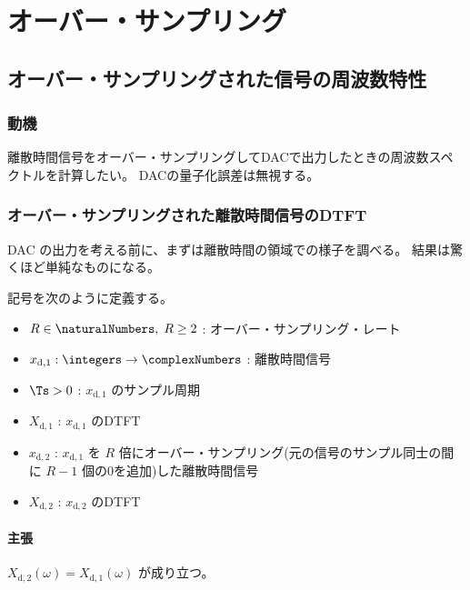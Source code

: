 \chapter{オーバー・サンプリング}
    \section{オーバー・サンプリングされた信号の周波数特性}
        \newcommand{\xda}{x_{\text{d},1}}
        \newcommand{\Xda}{X_{\text{d},1}}
        \newcommand{\xdb}{x_{\text{d},2}}
        \newcommand{\Xdb}{X_{\text{d},2}}
        \subsection{動機}
            離散時間信号をオーバー・サンプリングしてDACで出力したときの周波数スペクトルを計算したい。
            DACの量子化誤差は無視する。
        \subsection{オーバー・サンプリングされた離散時間信号のDTFT}
            DAC の出力を考える前に、まずは離散時間の領域での様子を調べる。
            結果は驚くほど単純なものになる。
            \par
            記号を次のように定義する。
            \begin{itemize}
                \item $R\in\naturalNumbers,\;R\geq 2$ : オーバー・サンプリング・レート
                \item $\xda:\integers\to\complexNumbers$ : 離散時間信号
                \item $\Ts>0$ : $\xda$ のサンプル周期
                \item $\Xda$ : $\xda$ のDTFT
                \item $\xdb$ : $\xda$ を $R$ 倍にオーバー・サンプリング(元の信号のサンプル同士の間に $R-1$ 個の0を追加)した離散時間信号
                \item $\Xdb$ : $\xdb$ のDTFT
            \end{itemize}
            \subsubsection{主張}
                $\Xdb(\omega) = \Xda(\omega)$ が成り立つ。
